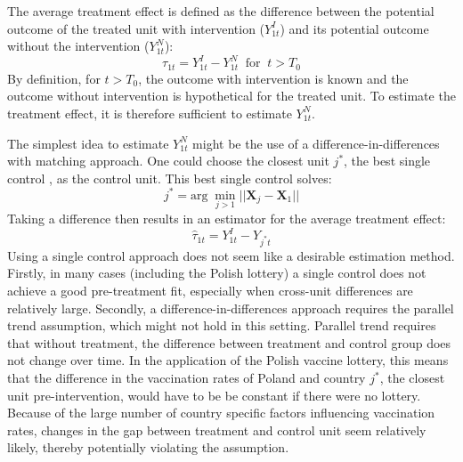 \documentclass{scrbook}
\begin{document}
The average treatment effect is defined as the difference between the
potential outcome of the treated unit with intervention (\(Y_{1t}^{I}\))
and its potential outcome without the intervention (\(Y_{1t}^{N}\)):
\begin{equation}
\tau_{1t}=Y_{1t}^{I}-Y_{1t}^{N}\; \; \text{for}\; \; t>T_{0}
\end{equation} By definition, for \(t>T_{0}\), the outcome with
intervention is known and the outcome without intervention is
hypothetical for the treated unit. To estimate the treatment effect, it
is therefore sufficient to estimate \(Y_{1t}^{N}\).

The simplest idea to estimate \(Y_{1t}^{N}\) might be the use of a
difference-in-differences with matching approach. One could choose the
closest unit \(j^{*}\), the best single control
\parencite{doudchenko_balancing_2016}, as the control unit. This best
single control solves: \begin{equation}
j^{*}=\text{arg}\; \min_{j>1}\vert\vert\mathbf{X}_{j}-\mathbf{X}_{1}\vert\vert
\end{equation} Taking a difference then results in an estimator for the
average treatment effect: \begin{equation}
\hat{\tau}_{1t}=Y_{1t}^{I}-Y_{j^{*}t}
\end{equation} Using a single control approach does not seem like a
desirable estimation method. Firstly, in many cases (including the
Polish lottery) a single control does not achieve a good pre-treatment
fit, especially when cross-unit differences are relatively large.
Secondly, a difference-in-differences approach requires the parallel
trend assumption, which might not hold in this setting. Parallel trend
requires that without treatment, the difference between treatment and
control group does not change over time. In the application of the
Polish vaccine lottery, this means that the difference in the
vaccination rates of Poland and country \(j^{*}\), the closest unit
pre-intervention, would have to be be constant if there were no lottery.
Because of the large number of country specific factors influencing
vaccination rates, changes in the gap between treatment and control unit
seem relatively likely, thereby potentially violating the assumption.
\end{document}
